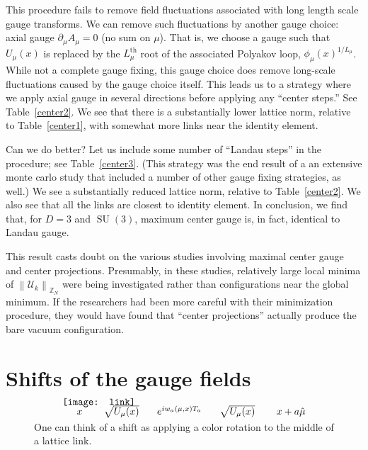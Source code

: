 \documentclass[preprint,aps,prd]{revtex4-2}
\newcommand{\zentrum}{{\mathbb{Z}_N}}       %
\newcommand{\config}{\mathcal{U}}
\DeclareMathOperator{\SU}{SU}
\begin{document}
This procedure fails to remove field fluctuations associated
with long length scale gauge transforms.  We can remove
such fluctuations by another gauge choice:  axial gauge
$\partial_\mu A_\mu = 0$ (no sum on $\mu$).
That is, we choose a gauge such that $U_\mu(x)$ is replaced
by the $L_\mu^\mathrm{th}$ root of the associated Polyakov loop,
$\phi_\mu(x)^{1/L_\mu}$.
While not a complete gauge fixing, this gauge choice does
remove long-scale fluctuations caused by the
gauge choice itself.
This leads us to a strategy where we apply axial gauge in several
directions before applying any ``center steps.'' See Table~\ref{center2}.
We see that there is a substantially lower lattice norm,
relative to Table~\ref{center1},
with somewhat more links near the identity element.

Can we do better? Let us include some number of ``Landau steps''
in the procedure; see Table~\ref{center3}.  (This strategy was
the end result of a an extensive monte carlo study that
included a number of other gauge fixing strategies, as well.)
We see a substantially reduced lattice norm, relative to
Table~\ref{center2}.  We also see that all the links are closest
to identity element.
In conclusion, we find that, for $D=3$ and $\SU(3)$,
maximum center gauge is, in fact, identical to Landau gauge.

This result casts doubt on the various studies involving maximal
center gauge and center projections.  Presumably,
in these studies, relatively large local minima of
$\left\lVert \config_k \right\rVert_\zentrum$ were being investigated
rather than configurations near the global minimum.
If the researchers had been more careful with their minimization
procedure, they would have found that ``center projections'' actually
produce the bare vacuum configuration.


\section{Shifts of the gauge fields}

\begin{figure}
  \[
  \begin{array}{l}
    \mbox{} \hspace{0.2in} x \hspace{0.3in} \sqrt{U_\mu(x)}
    \hspace{0.25in} e^{i w_{a}(\mu, x) T_a}
    \hspace{0.25in} \sqrt{U_\mu(x)} \hspace{0.3in} x+a\hat{\mu} \\[-0.3in]
  \texttt{[image: link]}
  \end{array}
  \]
  \caption{One can think of a shift as applying a color rotation
    to the middle of a lattice link. \label{shift}}
\end{figure}
\end{document}
